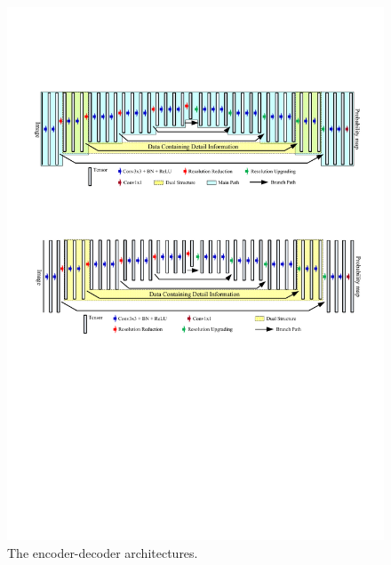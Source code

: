 \begin{figure}[t]
	\centering
	\includegraphics*[scale=0.875, viewport=43 558 558 710]{figures/comparison_encoder_decoders.pdf}
	\caption{The encoder-decoder architectures.}\label{fig_encoder_decoder}
\end{figure}
